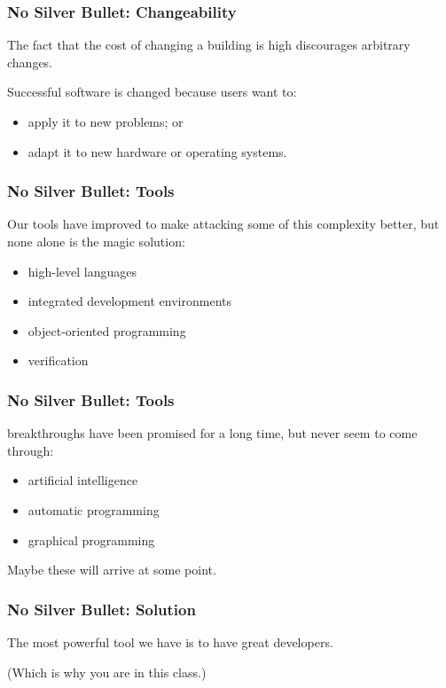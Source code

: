 \begin{frame}
\frametitle{No Silver Bullet: Changeability}
\begin{changemargin}{1cm}
The fact that the cost of changing a building is high discourages arbitrary changes. 

Successful software is changed because users want to: 
\begin{itemize}
	\item apply it to new problems; or 
	\item adapt it to new hardware or operating systems.
\end{itemize}

\end{changemargin}
\end{frame}

\begin{frame}
\frametitle{No Silver Bullet: Tools}
\begin{changemargin}{1cm}
Our tools have improved to make attacking some of this complexity better, but none alone is the magic solution: 
\begin{itemize}
	\item high-level languages
	\item integrated development environments
	\item object-oriented programming
	\item verification
\end{itemize}

\end{changemargin}
\end{frame}


\begin{frame}
\frametitle{No Silver Bullet: Tools}
\begin{changemargin}{1cm}
 breakthroughs have been promised for a long time, but never seem to come through:
 
\begin{itemize}
	\item artificial intelligence
	\item automatic programming
	\item graphical programming
\end{itemize}

Maybe these will arrive at some point.

\end{changemargin}
\end{frame}

\begin{frame}
\frametitle{No Silver Bullet: Solution}
\begin{changemargin}{1cm}

The most powerful tool we have is to have great developers.

(Which is why you are in this class.)
\end{changemargin}
\end{frame}



